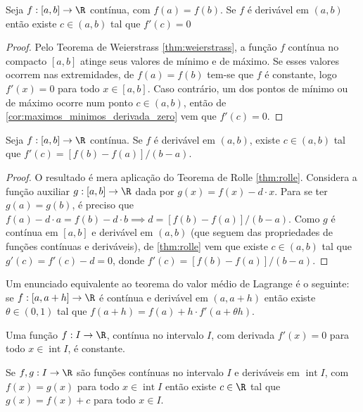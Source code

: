 \documentclass{article}
\begin{document}
\begin{thm} [Rolle] \label{thm:rolle}
    Seja \(f: [a,b] \to \R\) contínua, com \(f(a)=f(b)\). Se \(f\) é derivável em \((a,b)\) então existe \(c \in (a,b)\) tal que \(f'(c)=0\)
\end{thm}

\begin{proof}
    Pelo Teorema de Weierstrass \eqref{thm:weierstrass}, a função \(f\) contínua no compacto \([a,b]\) atinge seus valores de mínimo e de máximo. Se esses valores ocorrem nas extremidades, de \(f(a)=f(b)\) tem-se que \(f\) é constante, logo \(f'(x)=0\) para todo \(x \in [a,b]\). Caso contrário, um dos pontos de mínimo ou de máximo ocorre num ponto \(c \in (a,b)\), então de \eqref{cor:maximos_minimos_derivada_zero} vem que \(f'(c)=0\).
\end{proof}

\begin{thm} 
    Seja \(f: [a,b] \to \R\) contínua. Se \(f\) é derivável em \((a,b)\), existe \(c \in (a,b)\) tal que \(f'(c) = [f(b)-f(a)]/(b-a)\).
\end{thm}

\begin{proof}
    O resultado é mera aplicação do Teorema de Rolle \eqref{thm:rolle}. Considera a função auxiliar \(g: [a,b] \to \R\) dada por \(g(x) = f(x) - d\cdot x\). Para se ter \(g(a) = g(b)\), é preciso que \(f(a)-d\cdot a = f(b)-d\cdot b \implies d = [f(b)-f(a)]/(b-a)\). Como \(g\) é contínua em \([a,b]\) e derivável em \((a,b)\) (que seguem das propriedades de funções contínuas e deriváveis), de \eqref{thm:rolle} vem que existe \(c \in (a,b)\) tal que \(g'(c) = f'(c) - d = 0\), donde \(f'(c) = [f(b)-f(a)]/(b-a)\).
\end{proof}

\begin{rem}
    Um enunciado equivalente ao teorema do valor médio de Lagrange é o seguinte: se \(f: [a,a+h] \to \R\) é contínua e derivável em \((a,a+h)\) então existe \(\theta \in (0,1)\) tal que \(f(a+h) = f(a) + h \cdot f'(a + \theta h)\).
\end{rem}

\begin{cor}
    Uma função \(f: I \to \R\), contínua no intervalo \(I\), com derivada \(f'(x)=0\) para todo \(x \in \operatorname{int} I\), é constante.
\end{cor}

\begin{cor}
    Se \(f, g: I \to \R\) são funções contínuas no intervalo \(I\) e deriváveis em \(\operatorname{int} I\), com \(f(x) = g(x)\) para todo \(x \in \operatorname{int} I\) então existe \(c \in \R\) tal que \(g(x) = f(x) + c\) para todo \(x \in I\).
\end{cor}
\end{document}
